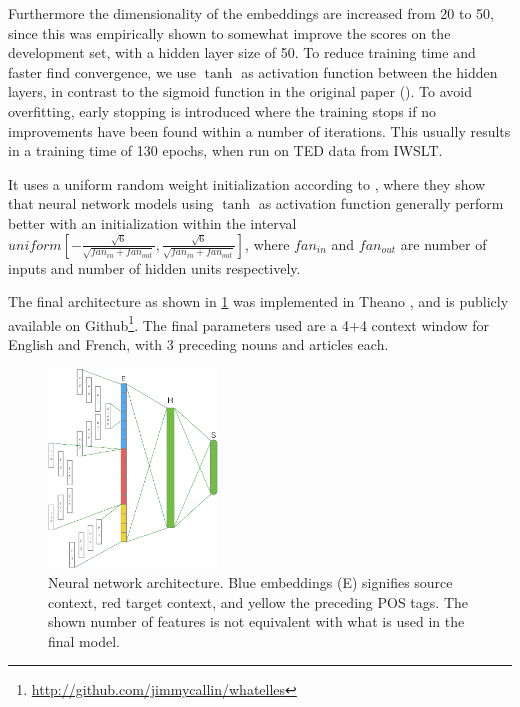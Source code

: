 \documentclass[11pt]{article}
\begin{document}
Furthermore the dimensionality of the embeddings are increased from 20 to 50, since this was empirically shown to somewhat improve the scores on the development set, with a hidden layer size of 50.
To reduce training time and faster find convergence, we use $\tanh$ as activation function between the hidden layers, in contrast to the sigmoid function in the original paper (\cite{Lecun2012Efficient}).
To avoid overfitting, early stopping is introduced where the training stops if no improvements have been found within a number of iterations.
This usually results in a training time of 130 epochs, when run on TED data from IWSLT.

It uses a uniform random weight initialization according to \textcite{Glorot2010Understanding}, where they show that neural network models using $\tanh$ as activation function generally perform better with an initialization within the interval $uniform[-\frac{\sqrt{6}}{\sqrt{fan_{in}+fan_{out}}},\frac{\sqrt{6}}{\sqrt{fan_{in}+fan_{out}}}]$, where $fan_{in}$ and $fan_{out}$ are number of inputs and number of hidden units respectively.

The final architecture as shown in \cref{fig:nnarchitecture} was implemented in Theano \cite{Bergstra2010Theano}, and is publicly available on Github\footnote{\url{http://github.com/jimmycallin/whatelles}}.
The final parameters used are a 4+4 context window for English and French, with 3 preceding nouns and articles each.

\begin{figure}[htbp]
    \centering
    \includegraphics[width=0.4\textwidth]{figures/nnarchitecture.pdf}
    \caption{Neural network architecture. Blue embeddings (E) signifies source context, red target context, and yellow the preceding POS tags. The shown number of features is not equivalent with what is used in the final model.}
    \label{fig:nnarchitecture}
\end{figure}
\end{document}
